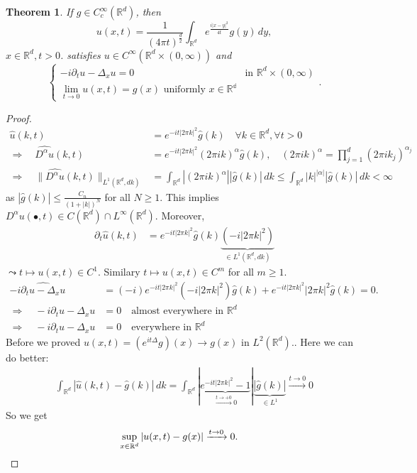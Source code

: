 \documentclass{report}
\theoremstyle{tommy}
\newtheorem{thm}[defn]{Theorem}
\begin{document}
  \begin{thm}
    If \(g \in C_c^\infty(\mathbb{R}^d)\), then 
    \[u(x,t) = \frac{1}{(4 \pi t)^{\frac{d}{2}}} \int_{\mathbb{R}^d} e^{\frac{i |x-y|^2}{4t}} g(y) \, dy,\]
    \(x \in \mathbb{R}^d, t> 0\). satisfies 
    \(u \in C^\infty(\mathbb{R}^d \times (0,\infty))\) and 
    \[\begin{cases}
      -i \partial_t u - \Delta_x u = 0 &\text{in } \mathbb{R}^d \times (0,\infty) \\
      \lim_{t \to 0} u(x,t) = g(x) \text{ uniformly } x \in \mathbb{R^d}
    \end{cases}.\]
  \end{thm}

  \begin{proof}
    \begin{align*}
      \hat u(k,t) &= e^{-it|2 \pi k|^2} \hat g (k) \quad \forall k \in \mathbb{R}^d, \forall t > 0 \\
      \Rightarrow \quad \widehat{D^\alpha u}(k,t) &= e^{-it |2 \pi k|^2} (2 \pi ik)^\alpha \hat g(k), \quad (2 \pi ik)^\alpha = \prod_{j=1}^d(2 \pi ik_j)^{\alpha_j} \\
      \Rightarrow \quad \|\widehat{D^\alpha u}(k,t)\|_{L^1(\mathbb{R}^d, dk)} &= \int_{\mathbb{R}^d} |(2 \pi ik)^\alpha| |\hat g (k)| \, dk  \le \int_{\mathbb{R}^d} |k|^{|\alpha|} |\hat g(k)| \, dk < \infty
    \end{align*}
    as \(|\hat g(k)| \le \frac{C_n}{(1 + |k|)^N}\) for all \(N \ge 1\). This implies \(D^\alpha u(\bullet, t) \in C(\mathbb{R}^d) \cap L^\infty(\mathbb{R}^d)\). Moreover,
    \begin{align*}
      \partial_t \hat u(k,t) &= e^{-it |2 \pi k|^2} \hat g(k) \underbrace{(-i |2 \pi k|^2)}_{\in L^1(\mathbb{R}^d, dk)}
    \end{align*}
    \(\leadsto t \mapsto u(x,t) \in C^1\). Similary \(t \mapsto u(x,t) \in C^m\) for all \(m \ge 1\).
    \begin{align*}
      - i \widehat{\partial_t u - \Delta_x u} &= (-i) e^{-it |2 \pi k|^2} (- i |2 \pi k|^2) \hat g(k) + e^{-it | 2 \pi k|^2} |2 \pi k|^2 \hat g(k) = 0. \\
      \Rightarrow \quad - i \partial_t u - \Delta_x u &= 0 \quad \text{almost everywhere in \(\mathbb{R}^d\)} \\
      \Rightarrow \quad - i \partial_t u - \Delta_x u &= 0 \quad \text{everywhere in \(\mathbb{R}^d\)}
    \end{align*}
    Before we proved \(u(x,t) = (e^{it \Delta} g)(x) \to g(x)\) in \(L^2(\mathbb{R}^d)\).. Here we can do better:
    \begin{align*}
      \int_{\mathbb{R}^d} | \hat u(k,t) - \hat g(k)|\, dk = \int_{\mathbb{R}^d} | \underbrace{e^{-it |2 \pi k|^2}-1}_{\xrightarrow{t \to +0}0}|\underbrace{|\hat g(k)|}_{\in L^1} \xrightarrow{t \to 0} 0
    \end{align*}
    So we get 
    \begin{align*}
      \sup_{x \in \mathbb{R}^d} |u(x,t) - g(x)|&\xrightarrow{t \to 0} 0. \qedhere
    \end{align*}
  \end{proof}
\end{document}
